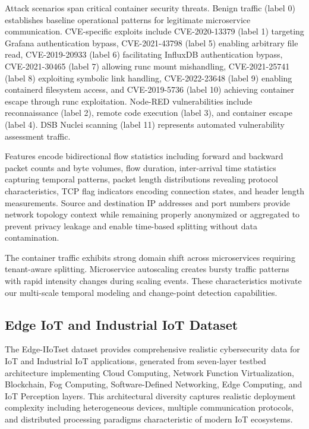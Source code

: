 \documentclass[10pt,journal,compsoc]{IEEEtran}
\begin{document}
Attack scenarios span critical container security threats. Benign traffic (label 0) establishes baseline operational patterns for legitimate microservice communication. CVE-specific exploits include CVE-2020-13379 (label 1) targeting Grafana authentication bypass, CVE-2021-43798 (label 5) enabling arbitrary file read, CVE-2019-20933 (label 6) facilitating InfluxDB authentication bypass, CVE-2021-30465 (label 7) allowing runc mount mishandling, CVE-2021-25741 (label 8) exploiting symbolic link handling, CVE-2022-23648 (label 9) enabling containerd filesystem access, and CVE-2019-5736 (label 10) achieving container escape through runc exploitation. Node-RED vulnerabilities include reconnaissance (label 2), remote code execution (label 3), and container escape (label 4). DSB Nuclei scanning (label 11) represents automated vulnerability assessment traffic.

Features encode bidirectional flow statistics including forward and backward packet counts and byte volumes, flow duration, inter-arrival time statistics capturing temporal patterns, packet length distributions revealing protocol characteristics, TCP flag indicators encoding connection states, and header length measurements. Source and destination IP addresses and port numbers provide network topology context while remaining properly anonymized or aggregated to prevent privacy leakage and enable time-based splitting without data contamination.

The container traffic exhibits strong domain shift across microservices requiring tenant-aware splitting. Microservice autoscaling creates bursty traffic patterns with rapid intensity changes during scaling events. These characteristics motivate our multi-scale temporal modeling and change-point detection capabilities.

\subsection{Edge IoT and Industrial IoT Dataset}

The Edge-IIoTset dataset provides comprehensive realistic cybersecurity data for IoT and Industrial IoT applications, generated from seven-layer testbed architecture implementing Cloud Computing, Network Function Virtualization, Blockchain, Fog Computing, Software-Defined Networking, Edge Computing, and IoT Perception layers. This architectural diversity captures realistic deployment complexity including heterogeneous devices, multiple communication protocols, and distributed processing paradigms characteristic of modern IoT ecosystems.
\end{document}
